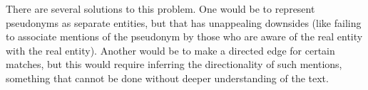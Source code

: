 There are several solutions to this problem. One would be to represent pseudonyms as separate entities, but that has unappealing downsides (like failing to associate mentions of the pseudonym by those who are aware of the real entity with the real entity). Another would be to make a directed edge for certain matches, but this would require inferring the directionality of such mentions, something that cannot be done without deeper understanding of the text.
